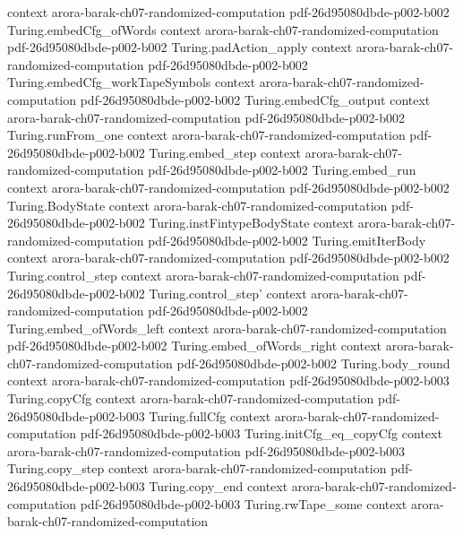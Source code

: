 \begin{theorem}
  {context}
  {arora-barak-ch07-randomized-computation}
  {pdf-26d95080dbde-p002-b002}
\proofstep
  {Turing.embedCfg_ofWords}
  {context}
  {arora-barak-ch07-randomized-computation}
  {pdf-26d95080dbde-p002-b002}
\proofstep
  {Turing.padAction_apply}
  {context}
  {arora-barak-ch07-randomized-computation}
  {pdf-26d95080dbde-p002-b002}
\proofstep
  {Turing.embedCfg_workTapeSymbols}
  {context}
  {arora-barak-ch07-randomized-computation}
  {pdf-26d95080dbde-p002-b002}
\proofstep
  {Turing.embedCfg_output}
  {context}
  {arora-barak-ch07-randomized-computation}
  {pdf-26d95080dbde-p002-b002}
\proofstep
  {Turing.runFrom_one}
  {context}
  {arora-barak-ch07-randomized-computation}
  {pdf-26d95080dbde-p002-b002}
\proofstep
  {Turing.embed_step}
  {context}
  {arora-barak-ch07-randomized-computation}
  {pdf-26d95080dbde-p002-b002}
\proofstep
  {Turing.embed_run}
  {context}
  {arora-barak-ch07-randomized-computation}
  {pdf-26d95080dbde-p002-b002}
\proofstep
  {Turing.BodyState}
  {context}
  {arora-barak-ch07-randomized-computation}
  {pdf-26d95080dbde-p002-b002}
\proofstep
  {Turing.instFintypeBodyState}
  {context}
  {arora-barak-ch07-randomized-computation}
  {pdf-26d95080dbde-p002-b002}
\proofstep
  {Turing.emitIterBody}
  {context}
  {arora-barak-ch07-randomized-computation}
  {pdf-26d95080dbde-p002-b002}
\proofstep
  {Turing.control_step}
  {context}
  {arora-barak-ch07-randomized-computation}
  {pdf-26d95080dbde-p002-b002}
\proofstep
  {Turing.control_step'}
  {context}
  {arora-barak-ch07-randomized-computation}
  {pdf-26d95080dbde-p002-b002}
\proofstep
  {Turing.embed_ofWords_left}
  {context}
  {arora-barak-ch07-randomized-computation}
  {pdf-26d95080dbde-p002-b002}
\proofstep
  {Turing.embed_ofWords_right}
  {context}
  {arora-barak-ch07-randomized-computation}
  {pdf-26d95080dbde-p002-b002}
\proofstep
  {Turing.body_round}
  {context}
  {arora-barak-ch07-randomized-computation}
  {pdf-26d95080dbde-p002-b003}
\proofstep
  {Turing.copyCfg}
  {context}
  {arora-barak-ch07-randomized-computation}
  {pdf-26d95080dbde-p002-b003}
\proofstep
  {Turing.fullCfg}
  {context}
  {arora-barak-ch07-randomized-computation}
  {pdf-26d95080dbde-p002-b003}
\proofstep
  {Turing.initCfg_eq_copyCfg}
  {context}
  {arora-barak-ch07-randomized-computation}
  {pdf-26d95080dbde-p002-b003}
\proofstep
  {Turing.copy_step}
  {context}
  {arora-barak-ch07-randomized-computation}
  {pdf-26d95080dbde-p002-b003}
\proofstep
  {Turing.copy_end}
  {context}
  {arora-barak-ch07-randomized-computation}
  {pdf-26d95080dbde-p002-b003}
\proofstep
  {Turing.rwTape_some}
  {context}
  {arora-barak-ch07-randomized-computation}

\end{theorem}
